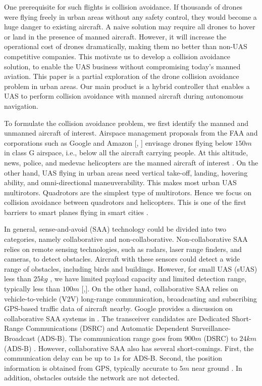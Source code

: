 \documentclass[journal,11pt,onecolumn,draftclsnofoot,]{IEEEtran}
\begin{document}
One prerequisite for such flights is collision avoidance. If thousands of drones were flying freely in urban areas without any safety control, they would become a huge danger to existing aircraft. A naive solution may require all drones to hover or land in the presence of manned aircraft. However, it will increase the operational cost of drones dramatically, making them no better than non-UAS competitive companies. This motivate us to develop a collision avoidance solution, to enable the UAS business without compromising today's manned aviation. This paper is a partial exploration of the drone collision avoidance problem in urban areas. Our main product is a hybrid controller that enables a UAS to perform collision avoidance with manned aircraft during autonomous navigation. 

To formulate the collision avoidance problem, we first identify the manned and unmanned aircraft of interest. Airspace management proposals from the FAA \cite{faa-nprm} and corporations such as Google \cite{google_airspace_system} and Amazon [, ] envisage drones flying below $150m$ in class G airspace, i.e., below all the aircraft carrying people. At this altitude, news, police, and medevac helicopters are the manned aircraft of interest \cite{google_airspace_system}. On the other hand, UAS flying in urban areas need vertical take-off, landing, hovering ability, and omni-directional maneuverability. This makes most urban UAS multirotors. Quadrotors are the simplest type of multirotors. Hence we focus on collision avoidance between quadrotors and helicopters. This is one of the first barriers to smart planes flying in smart cities \cite{google_airspace_system}.

In general, sense-and-avoid (SAA) technology could be divided into two categories, namely collaborative and non-collaborative. Non-collaborative SAA relies on remote sensing technologies, such as radars, laser range finders, and cameras, to detect obstacles. Aircraft with these sensors could detect a wide range of obstacles, including birds and buildings. However, for small UAS (sUAS) less than $25 kg$ \cite{faa-nprm}, we have limited payload capacity and limited detection range, typically less than $100m$ [,]. On the other hand, collaborative SAA relies on vehicle-to-vehicle (V2V) long-range communication, broadcasting and subscribing GPS-based traffic data of aircraft nearby. Google provides a discussion on collaborative SAA systems in \cite{google_airspace_system}. The transceiver candidates are Dedicated Short-Range Communications (DSRC) and Automatic Dependent Surveillance-Broadcast (ADS-B). The communication range goes from $900m$ (DSRC) \cite{msadaa2010comparative} to $24km$ (ADS-B) \cite{sagetech}. However, collaborative SAA also has several short-comings. First, the communication delay can be up to $1 s$ for ADS-B. Second, the position information is obtained from GPS, typically accurate to $5m$ near ground \cite{gps_accuracy}. In addition, obstacles outside the network are not detected. 
\end{document}
